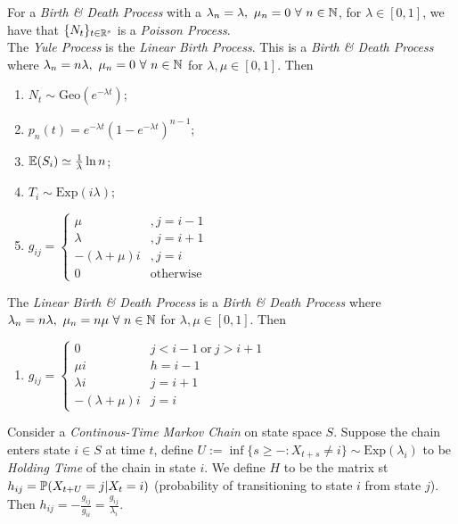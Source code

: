 \documentclass[11pt,a4paper]{article}
\begin{document}
For a \textit{Birth \& Death Process} with a $\lambda_n=\lambda,\ \mu_n=0\ \forall\ n\in\nats$, for $\lambda\in[0,1]$, we have that $\{N_t\}_{t\in\mathbb{R}^s}$ is a \textit{Poisson Process}.\\

The \textit{Yule Process} is the \textit{Linear Birth Process}. This is a \textit{Birth \& Death Process} where $\lambda_n=n\lambda,\ \mu_n=0\ \forall\ n\in\nats$ for $\lambda,\mu\in[0,1]$. Then
\begin{enumerate}
	\item $N_t\sim\mathrm{Geo}(e^{-\lambda t})$;
	\item $p_n(t)=e^{-\lambda t}(1-e^{-\lambda t})^{n-1}$;
	\item $\mathbb{E}(S_i)\simeq\frac{1}{\lambda}\ln n$;
	\item $T_i\sim\mathrm{Exp}(i\lambda)$;
	\item $g_{ij}=\begin{cases}\mu&,j=i-1\\\lambda&,j=i+1\\-(\lambda+\mu)i&,j=i\\0&\mathrm{otherwise}\end{cases}$
\end{enumerate}

The \textit{Linear Birth \& Death Process} is a \textit{Birth \& Death Process} where $\lambda_n=n\lambda,\ \mu_n=n\mu\ \forall\ n\in\nats$ for $\lambda,\mu\in[0,1]$. Then
\begin{enumerate}
	\item $g_{ij}=\begin{cases}0&j<i-1\ \mathrm{or}\ j>i+1\\\mu i&h=i-1\\\lambda i&j=i+1\\-(\lambda+\mu)i&j=i\end{cases}$
\end{enumerate}

Consider a \textit{Continous-Time Markov Chain} on state space $S$. Suppose the chain enters state $i\in S$ at time $t$, define $U:=\inf\{s\geq-:X_{t+s}\neq i\}\sim\mathrm{Exp}(\lambda_i)$ to be \textit{Holding Time} of the chain in state $i$. We define $H$ to be the matrix st $h_{ij}=\mathbb{P}(X_{t+U}=j|X_t=i)$ (probability of transitioning to state $i$ from state $j$). Then $h_{ij}=-\frac{g_{ij}}{g_{ii}}=\frac{g_{ij}}{\lambda_i}$.\\
\end{document}
